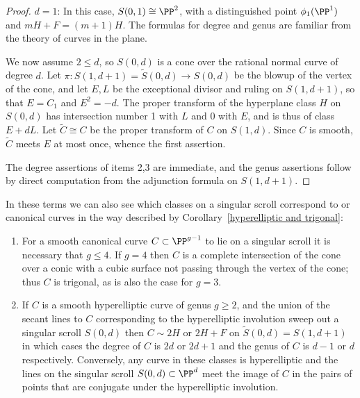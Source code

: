 \begin{proof}
\noindent $d=1$: In this case, $S(0,1)\cong \PP^{2}$, with a distinguished
point $\phi_{1}(\PP^{1})$ and $mH+F = (m+1)H$.
The formulas for degree and genus are familiar from the theory of curves
in the plane.

We now assume $2\leq d$, so $S(0,d)$ is a cone over the rational normal
curve of degree $d$. Let $\pi: S(1,d+1) = \tilde S(0,d) \to S(0,d)$
be the blowup of the vertex of the cone, and let $E,L$ be the exceptional
divisor and ruling on $S(1, d+1)$,
so that $E = C_{1}$ and $E^{2} = -d$. The proper transform of the
hyperplane class $H$ on $S(0,d)$ has intersection number 1 with $L$
and $0$ with $E$,
and is thus of class $E+dL$. Let $\tilde C \cong C$ be the proper
transform of $C$ on $S(1,d)$.
Since $C$ is smooth, $\tilde C$ meets $E$ at most once, whence the
first assertion.

The degree assertions of items 2,3 are immediate, and the genus assertions
follow by direct computation from the
adjunction formula on $S(1,d+1)$.
\end{proof}

In these terms we can also see which classes on a singular scroll
correspond to 
%
 or canonical 
%
 curves in the way
described by Corollary~\ref{hyperelliptic and trigonal}:

\begin{corollary}\label{which class}
\begin{enumerate}
\item For a smooth canonical curve $C\subset \PP^{g-1}$ to lie on a
singular scroll it is necessary that $g\leq 4$.
If $g=4$ then $C$ is a complete intersection of the cone over a conic
with a cubic surface not passing through
the vertex of the cone; thus $C$ is trigonal, as is also the case
for $g=3$.

\item If  $C$ is a smooth hyperelliptic curve of genus $g\geq 2$, and
the union of the secant lines to $C$ corresponding to the
hyperelliptic involution sweep out 
a singular scroll $S(0,d)$ then
$C\sim 2H$ or $2H+F$ on $\tilde S(0,d) = S(1,d+1)$ in which cases
the degree of $C$ is $2d$ or $2d+1$ and the genus of $C$ is $d-1$ or $d$
respectively. Conversely,
any  curve in these classes is hyperelliptic and the lines on the singular
scroll	$S(0,d)\subset \PP^{d}$
meet the image of $C$ in the pairs of points that are conjugate under
the hyperelliptic involution.
\unif
\end{enumerate}
\end{corollary}


